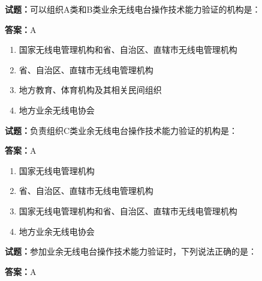 \documentclass{ctexbook}
\begin{document}




\vspace{1em}

\textbf{试题：}可以组织A类和B类业余无线电台操作技术能力验证的机构是： 

\textbf{答案：}A 

\begin{enumerate}[leftmargin=3em]
  \item 国家无线电管理机构和省、自治区、直辖市无线电管理机构 

  \item 省、自治区、直辖市无线电管理机构 

  \item 地方教育、体育机构及其相关民间组织 

  \item 地方业余无线电协会 

\end{enumerate}





\vspace{1em}

\textbf{试题：}负责组织C类业余无线电台操作技术能力验证的机构是： 

\textbf{答案：}A 


\begin{enumerate}[leftmargin=3em]
  \item 国家无线电管理机构 

  \item 省、自治区、直辖市无线电管理机构 

  \item 国家无线电管理机构和省、自治区、直辖市无线电管理机构 

  \item 地方业余无线电协会 

\end{enumerate}





\vspace{1em}

\textbf{试题：}参加业余无线电台操作技术能力验证时，下列说法正确的是： 

\textbf{答案：}A 
\end{document}
